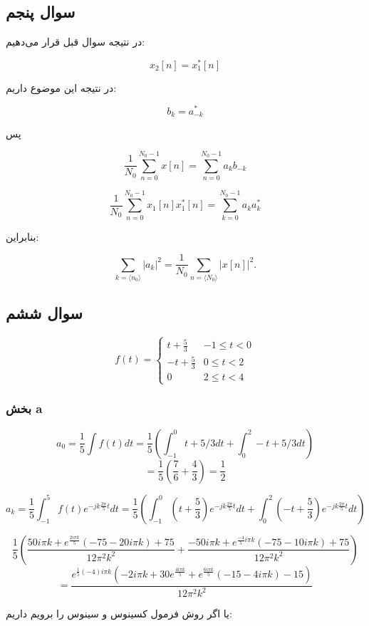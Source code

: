 \documentclass[12pt]{article}
\begin{document}
\newpage
\subsection{سوال پنجم}

در نتیجه سوال قبل قرار می‌دهیم:

$$x_2[n] = x^*_1[n]$$

در نتیجه این موضوع داریم:

$$b_k = a^*_{-k}$$

پس

$$
\frac{1}{N_{0}} \sum_{n=0}^{N_{0}-1} x[n]=\sum_{n=0}^{N_{0}-1} a_{k} b_{-k}
$$

$$
\frac{1}{N_{0}} \sum_{n=0}^{N_{0}-1} x_1[n] x_1^*[n]=\sum_{k=0}^{N_{0}-1} a_{k} a^*_{k}
$$

بنابراین:

$$
\sum_{k=\langle n_0\rangle}\left|a_{k}\right|^{2}=\frac{1}{N_0} \sum_{n=\langle N_0\rangle}|x[n]|^{2} .
$$

\newpage
\subsection{سوال ششم}
$$
f(t)=\left\{\begin{array}{lc}
	t+\frac{5}{3} & -1 \leq t<0 \\
	-t+\frac{5}{3} & 0 \leq t<2 \\
	0 & 2 \leq t<4
\end{array}\right.
$$

\subsubsection{بخش a}
$$a_0 = \frac{1}{5} \int f(t) dt = \frac{1}{5}( \int_{-1}^{0} t + 5/3 dt  + \int_{0}^{2} -t + 5/3 dt )$$
$$= \frac{1}{5}(\frac{7}{6} + \frac{4}{3}) =\boxed{ \frac{1}{2}}$$

$$a_k = \frac{1}{5} \int_{-1}^{5} f(t) e^{-j k \frac{2\pi}{5} t} dt = \frac{1}{5} (\int_{-1}^{0} (t+\frac{5}{3}) e^{-j k \frac{2\pi}{5} t} dt + \int_{0}^{2} (-t+\frac{5}{3}) e^{-j k \frac{2\pi}{5} t} dt)$$


$$\frac{1}{5} (\frac{50 i \pi  k+e^{\frac{2 i \pi  k}{5}} (-75-20 i \pi  k)+75}{12 \pi ^2 k^2} + \frac{-50 i \pi  k+e^{\frac{-4}{5} i \pi  k} (-75-10 i \pi  k)+75}{12 \pi ^2 k^2})$$$$ = \frac{e^{\frac{1}{5} (-4) i \pi  k} \left(-2 i \pi  k+30 e^{\frac{4 i \pi  k}{5}}+e^{\frac{6 i \pi  k}{5}} (-15-4 i \pi  k)-15\right)}{12 \pi ^2 k^2} $$


یا اگر روش فرمول کسینوس و سینوس را برویم داریم:
\end{document}
